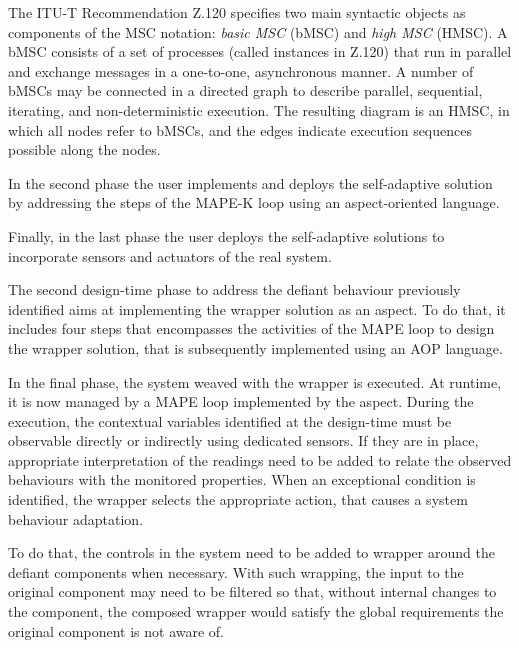 The ITU-T Recommendation Z.120 \cite{itu1994} specifies two main syntactic objects as components of the MSC notation: \textit{basic MSC} (bMSC) and \textit{high MSC} (HMSC). A bMSC consists of a set of processes (called instances in Z.120) that run in parallel and exchange messages in a one-to-one, asynchronous manner. A number of bMSCs may be connected in a directed graph to describe parallel, sequential, iterating, and non-deterministic execution. The resulting diagram is an HMSC, in which all nodes refer to bMSCs, and the edges indicate execution sequences possible along the nodes. %

In the second phase the user implements and deploys the self-adaptive solution by addressing the steps of the MAPE-K loop using an aspect-oriented language. 

Finally, in the last phase the user deploys the self-adaptive solutions to incorporate sensors and actuators of the real system.

The second design-time phase to address the defiant behaviour previously identified aims at implementing the wrapper solution as an aspect. To do that, it includes four steps that encompasses the activities of the MAPE loop to design the wrapper solution, that is subsequently implemented using an AOP language. 



In the final phase, the system weaved with the wrapper is executed. At runtime, it is now managed by a MAPE loop implemented by the aspect. During the execution, the contextual variables identified at the design-time must be observable directly or indirectly using dedicated sensors. If they are in place, appropriate interpretation of the readings need to be added to relate the observed behaviours with the monitored properties. When an exceptional condition is identified, the wrapper selects the appropriate action, that causes a system behaviour adaptation. 

To do that, the controls in the system need to be added to wrapper around the defiant components when necessary. With such wrapping, the input to the original component may need to be filtered so that, without internal changes to the component, the composed wrapper would satisfy the global requirements the original component is not aware of. 

